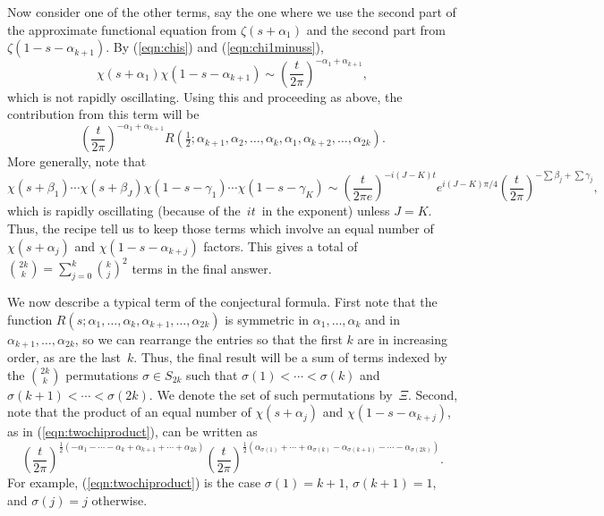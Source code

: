 \documentclass[12pt,letterpaper]{amsart}
\theoremstyle{plain}
\theoremstyle{definition}
\theoremstyle{remark}
\numberwithin{equation}{subsection}
\numberwithin{theorem}{subsection}
\numberwithin{table}{subsection}
\def\({\left(}
\def\){\right)}
\begin{document}
Now consider one of the other terms, say the one where we use the
second part of the approximate functional equation from 
$\zeta(s+\alpha _1)$ and the second part from 
$\zeta(1-s-\alpha _{k+1})$. 
By (\ref{eqn:chis}) and (\ref{eqn:chi1minuss}),
\begin{equation}\label{eqn:twochiproduct}
\chi(s+\alpha _1)\chi(1-s-\alpha _{k+1}) \sim
\left(\frac{t}{2\pi}\right)^{-\alpha _1+\alpha _{k+1}},
\end{equation}
which is not rapidly oscillating.
Using this and proceeding as above, the contribution from this term will
be
\begin{equation}
\(\frac{t}{2\pi}\)^{-\alpha _1+\alpha _{k+1}}
R(\tfrac{1}{2};
\alpha _{k+1},
\alpha _2,\dots,\alpha _k,
\alpha _1,\alpha
_{k+2},\dots,\alpha _{2k}).
\end{equation}
More generally, note that
\begin{equation}
\chi(s+\beta _1)\cdots \chi(s+\beta _J)
\chi(1-s-\gamma _{1}) \cdots \chi(1-s-\gamma _{K}) \sim
\(\frac{t}{2\pi e}\)^{-i(J-K)t} 
e^{i(J-K)\pi/4} 
\left(\frac{t}{2\pi}\right)^{-\sum\beta_j+ \sum\gamma_{j}},
\end{equation}
which is rapidly oscillating (because of the $\,it\,$ in the exponent) unless $J=K$.
Thus, the recipe tell us to keep those terms which involve
an equal number of $\chi(s+\alpha_j)$ and $\chi(1-s-\alpha_{k+j})$
factors.  This gives  a total of
$\binom{2k}{k}= \sum_{j=0}^k \binom{k}{j}^2$ terms in the final answer.

We now describe a typical term of the   conjectural formula. 
First note that the function
$ R(s; \alpha_1, \dots,\alpha _k, \alpha_{k+1},\dots,\alpha _{2k})$
is symmetric in $\alpha_1, \dots,\alpha _k$ and in 
$\alpha_{k+1},\dots,\alpha _{2k}$, so we can rearrange the entries so
that the first $k$ are in increasing order, as are the
last~$k$.  Thus, the final result will be a sum of terms indexed
by the $\binom{2k}{k}$ permutations
$\sigma\in S_{2k}$ such that $\sigma(1)<\cdots<\sigma(k)$ and
$\sigma(k+1)<\cdots< \sigma(2k)$.
We denote the set of such permutations by~$\Xi$.
Second, note that  
the product of an equal number of $\chi(s+\alpha _j)$ and $\chi(1-s-\alpha _{k+j})$,
as in (\ref{eqn:twochiproduct}), can be written as
\begin{equation}
\left( \frac{t}{2\pi}
\right)^{\frac{1}{2}(-\alpha _1-\cdots
 -\alpha _k+\alpha _{k+1}+\cdots +\alpha _{2k})}
\left( \frac{t}{2\pi}\right)^{\frac{1}{2}
(\alpha _{\sigma(1)}+ \cdots + \alpha _{\sigma(k)} -\alpha
      _{\sigma(k+1)}-\cdots -\alpha _{\sigma(2k)})} .
\end{equation}
For example, (\ref{eqn:twochiproduct}) is the case
$\sigma(1)=k+1$, $\sigma(k+1)=1$, and $\sigma(j)=j$ otherwise. 
\end{document}
